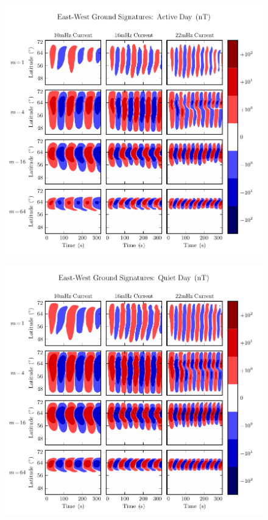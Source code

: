 \begin{figure}[H]
    \centering
    \includegraphics[width=\textwidth]{figures/BfE_J_1.pdf}
    \caption[East-West Ground Signatures: Active Day]{}
    \label{fig_BfE_J_1}
\end{figure}

\begin{figure}[H]
    \centering
    \includegraphics[width=\textwidth]{figures/BfE_J_2.pdf}
    \caption[East-West Ground Signatures: Quiet Day]{}
    \label{fig_BfE_J_2}
\end{figure}

